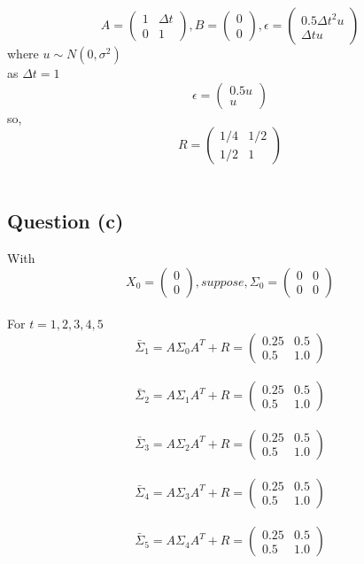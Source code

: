 \documentclass{article}
\begin{document}
$$A = \begin{pmatrix}
1 & \Delta t\\
0 & 1 
\end{pmatrix}, 
B = 
\begin{pmatrix}
0 \\
0
\end{pmatrix}, 
\epsilon = 
\begin{pmatrix}
0.5{\Delta t}^2 u\\
\Delta t u
\end{pmatrix}
$$ where $u\sim{N(0, \sigma^2)}$\\
as $\Delta t = 1$\\
$$
\epsilon = 
\begin{pmatrix}
0.5u\\
u
\end{pmatrix}
$$
so,
$$
R = 
\begin{pmatrix}
1/4 & 1/2\\
1/2 & 1
\end{pmatrix}
$$\\




\subsection{Question (c)}
With $$X_0 = \begin{pmatrix}
0\\0
\end{pmatrix}
, suppose, 
\Sigma_0 = 
\begin{pmatrix}
0&0\\0&0
\end{pmatrix}
$$\\ 
For $t = 1, 2, 3, 4, 5$\\
$$ 
\bar{\Sigma}_1 = A\Sigma_0A^{T}+R=\begin{pmatrix}
0.25 & 0.5 \\
0.5  & 1.0
\end{pmatrix}
$$\\
$$ 
\bar{\Sigma}_2 = A\Sigma_1A^{T}+R=\begin{pmatrix}
0.25 & 0.5 \\
0.5  & 1.0
\end{pmatrix}
$$\\
$$ 
\bar{\Sigma}_3 = A\Sigma_2A^{T}+R=\begin{pmatrix}
0.25 & 0.5 \\
0.5  & 1.0
\end{pmatrix}
$$\\
$$ 
\bar{\Sigma}_4 = A\Sigma_3A^{T}+R=\begin{pmatrix}
0.25 & 0.5 \\
0.5  & 1.0
\end{pmatrix}
$$\\
$$ 
\bar{\Sigma}_5 = A\Sigma_4A^{T}+R=\begin{pmatrix}
0.25 & 0.5 \\
0.5  & 1.0
\end{pmatrix}
$$\\
\end{document}
